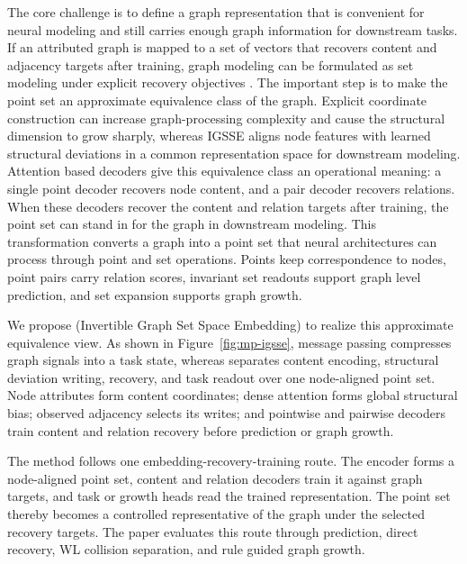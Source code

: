 The core challenge is to define a graph representation that is convenient for
neural modeling and still carries enough graph information for downstream tasks.
If an attributed graph is mapped to a set of vectors that recovers content and
adjacency targets after training, graph modeling can be formulated as set
modeling under explicit recovery objectives
\cite{zaheer2017,lee2019,wang2024graphpointset}.  The important step is to make
the point set an approximate equivalence class of the graph.  Explicit coordinate
construction can increase graph-processing complexity and cause the structural
dimension to grow sharply, whereas IGSSE aligns node features with learned
structural deviations in a common representation space for downstream modeling.
Attention based
decoders give this equivalence class an operational meaning: a single point
decoder recovers node content, and a pair decoder recovers relations.  When
these decoders recover the content and relation targets after training, the point set can
stand in for the graph in downstream modeling.  This transformation converts a
graph into a point set that neural architectures can process through point and
set operations.  Points keep correspondence to nodes, point pairs carry relation
scores, invariant set readouts support graph level prediction, and set expansion
supports graph growth.

We propose \method{} (Invertible Graph Set Space Embedding) to realize this
approximate equivalence view.  As shown in Figure~\ref{fig:mp-igsse}, message
passing compresses graph signals into a task state, whereas \method{} separates
content encoding, structural deviation writing, recovery, and task readout over
one node-aligned point set.  Node attributes form content coordinates; dense
attention forms global structural bias; observed adjacency selects its writes;
and pointwise and pairwise decoders train content and relation recovery before
prediction or graph growth.

The method follows one embedding-recovery-training route.  The encoder forms a
node-aligned point set, content and relation decoders train it against graph
targets, and task or growth heads read the trained representation.  The point
set thereby becomes a controlled representative of the graph under the selected
recovery targets.  The paper evaluates this route through prediction, direct
recovery, WL collision separation, and rule guided graph growth.

